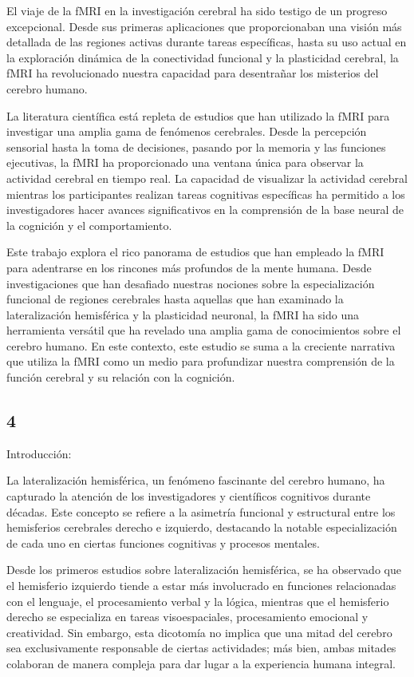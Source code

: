 \documentclass[12pt,oneside]{uhthesis}
\begin{document}
El viaje de la fMRI en la investigación cerebral ha sido testigo de un progreso excepcional. Desde sus primeras aplicaciones que proporcionaban una visión más detallada de las regiones activas durante tareas específicas, hasta su uso actual en la exploración dinámica de la conectividad funcional y la plasticidad cerebral, la fMRI ha revolucionado nuestra capacidad para desentrañar los misterios del cerebro humano.

La literatura científica está repleta de estudios que han utilizado la fMRI para investigar una amplia gama de fenómenos cerebrales. Desde la percepción sensorial hasta la toma de decisiones, pasando por la memoria y las funciones ejecutivas, la fMRI ha proporcionado una ventana única para observar la actividad cerebral en tiempo real. La capacidad de visualizar la actividad cerebral mientras los participantes realizan tareas cognitivas específicas ha permitido a los investigadores hacer avances significativos en la comprensión de la base neural de la cognición y el comportamiento.

Este trabajo explora el rico panorama de estudios que han empleado la fMRI para adentrarse en los rincones más profundos de la mente humana. Desde investigaciones que han desafiado nuestras nociones sobre la especialización funcional de regiones cerebrales hasta aquellas que han examinado la lateralización hemisférica y la plasticidad neuronal, la fMRI ha sido una herramienta versátil que ha revelado una amplia gama de conocimientos sobre el cerebro humano. En este contexto, este estudio se suma a la creciente narrativa que utiliza la fMRI como un medio para profundizar nuestra comprensión de la función cerebral y su relación con la cognición.

\subsection{4}

Introducción:

La lateralización hemisférica, un fenómeno fascinante del cerebro humano, ha capturado la atención de los investigadores y científicos cognitivos durante décadas. Este concepto se refiere a la asimetría funcional y estructural entre los hemisferios cerebrales derecho e izquierdo, destacando la notable especialización de cada uno en ciertas funciones cognitivas y procesos mentales.

Desde los primeros estudios sobre lateralización hemisférica, se ha observado que el hemisferio izquierdo tiende a estar más involucrado en funciones relacionadas con el lenguaje, el procesamiento verbal y la lógica, mientras que el hemisferio derecho se especializa en tareas visoespaciales, procesamiento emocional y creatividad. Sin embargo, esta dicotomía no implica que una mitad del cerebro sea exclusivamente responsable de ciertas actividades; más bien, ambas mitades colaboran de manera compleja para dar lugar a la experiencia humana integral.
\end{document}
